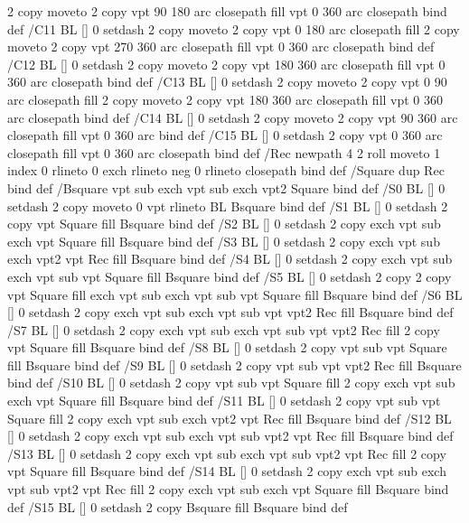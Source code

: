 {{{       2 copy moveto
       2 copy vpt 90 180 arc closepath fill
               vpt 0 360 arc closepath } bind def
/C11 { BL [] 0 setdash 2 copy moveto
       2 copy  vpt 0 180 arc closepath fill
       2 copy moveto
       2 copy  vpt 270 360 arc closepath fill
               vpt 0 360 arc closepath } bind def
/C12 { BL [] 0 setdash 2 copy moveto
       2 copy  vpt 180 360 arc closepath fill
               vpt 0 360 arc closepath } bind def
/C13 { BL [] 0 setdash  2 copy moveto
       2 copy  vpt 0 90 arc closepath fill
       2 copy moveto
       2 copy  vpt 180 360 arc closepath fill
               vpt 0 360 arc closepath } bind def
/C14 { BL [] 0 setdash 2 copy moveto
       2 copy  vpt 90 360 arc closepath fill
               vpt 0 360 arc } bind def
/C15 { BL [] 0 setdash 2 copy vpt 0 360 arc closepath fill
               vpt 0 360 arc closepath } bind def
/Rec   { newpath 4 2 roll moveto 1 index 0 rlineto 0 exch rlineto
       neg 0 rlineto closepath } bind def
/Square { dup Rec } bind def
/Bsquare { vpt sub exch vpt sub exch vpt2 Square } bind def
/S0 { BL [] 0 setdash 2 copy moveto 0 vpt rlineto BL Bsquare } bind def
/S1 { BL [] 0 setdash 2 copy vpt Square fill Bsquare } bind def
/S2 { BL [] 0 setdash 2 copy exch vpt sub exch vpt Square fill Bsquare } bind def
/S3 { BL [] 0 setdash 2 copy exch vpt sub exch vpt2 vpt Rec fill Bsquare } bind def
/S4 { BL [] 0 setdash 2 copy exch vpt sub exch vpt sub vpt Square fill Bsquare } bind def
/S5 { BL [] 0 setdash 2 copy 2 copy vpt Square fill
       exch vpt sub exch vpt sub vpt Square fill Bsquare } bind def
/S6 { BL [] 0 setdash 2 copy exch vpt sub exch vpt sub vpt vpt2 Rec fill Bsquare } bind def
/S7 { BL [] 0 setdash 2 copy exch vpt sub exch vpt sub vpt vpt2 Rec fill
       2 copy vpt Square fill
       Bsquare } bind def
/S8 { BL [] 0 setdash 2 copy vpt sub vpt Square fill Bsquare } bind def
/S9 { BL [] 0 setdash 2 copy vpt sub vpt vpt2 Rec fill Bsquare } bind def
/S10 { BL [] 0 setdash 2 copy vpt sub vpt Square fill 2 copy exch vpt sub exch vpt Square fill
       Bsquare } bind def
/S11 { BL [] 0 setdash 2 copy vpt sub vpt Square fill 2 copy exch vpt sub exch vpt2 vpt Rec fill
       Bsquare } bind def
/S12 { BL [] 0 setdash 2 copy exch vpt sub exch vpt sub vpt2 vpt Rec fill Bsquare } bind def
/S13 { BL [] 0 setdash 2 copy exch vpt sub exch vpt sub vpt2 vpt Rec fill
       2 copy vpt Square fill Bsquare } bind def
/S14 { BL [] 0 setdash 2 copy exch vpt sub exch vpt sub vpt2 vpt Rec fill
       2 copy exch vpt sub exch vpt Square fill Bsquare } bind def
/S15 { BL [] 0 setdash 2 copy Bsquare fill Bsquare } bind def
}}
